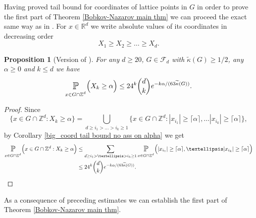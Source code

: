 \documentclass[10pt,a4paper]{amsart}
\numberwithin{equation}{section}
\newtheorem{Prop}[Thm]{Proposition}
\newcommand{\Pro}{\mathop{\mathbb{P}}}
\newcommand{\Z}{\mathbb{Z}}
\newcommand{\R}{\mathbb{R}}
\newcommand{\spr}[1]{\underset{_{\substack{#1}}}{\mathlarger{\mathlarger{\Pro}}}}
\begin{document}
Having proved tail bound for coordinates of lattice points in $G$ in order to prove the first part of Theorem \ref{Bobkov-Nazarov main thm} we can proceed the exact same way as in \cite[Sections 4,5]{bob-naz}.
For $x \in \R^d$ we write absolute values of its coordinates in decreasing order
\[
X_1 \ge X_2 \ge \ldots \ge X_d.
\]
\begin{Prop}[Version of {\cite[Proposition 4.1]{bob-naz}}] \label{ordered tail bound}
    For any $d \ge 20$, $G \in \mathcal{F}_d$ with $\widetilde{\kappa}(G) \ge 1/2$, any $\alpha \ge 0$ and $k \le d$ we have
    \[
    \spr{x \in G \cap \Z^d} \Big( X_k \ge \alpha \Big)\le 24^k \binom{d}{k} e^{-k \alpha/(63\widetilde{\kappa}(G))}.
    \]
\end{Prop}
\begin{proof}
    Since 
    \[
    \Big\{ x \in G \cap \Z^d: X_k \ge \alpha \Big\}= \bigcup_{d \ge i_1 > \ldots>i_k \ge 1} \Big\{x \in G \cap \Z^d:|x_{i_1}| \ge \lceil \alpha \rceil,\ldots |x_{i_k}| \ge \lceil \alpha \rceil \Big\},
    \]
by Corollary \ref{big_coord tail bound no ass on alpha} we get 
\begin{align*}
   \spr{x \in G \cap \Z^d} \Big(x \in G \cap \Z^d: X_k \ge \alpha \Big) &\le \sum_{d \ge i_1 > \ldots>i_k \ge 1} \spr{x \in G \cap \Z^d} \Big(|x_{i_1}| \ge \lceil \alpha \rceil,\ldots |x_{i_k}| \ge \lceil \alpha \rceil \Big) \\
    &\le 24^k \binom{d}{k} e^{-k\alpha/(63 \widetilde{\kappa}(G))}.
\end{align*}
\end{proof}
As a consequence of preceding estimates we can establish the first part of Theorem \ref{Bobkov-Nazarov main thm}.
\end{document}
